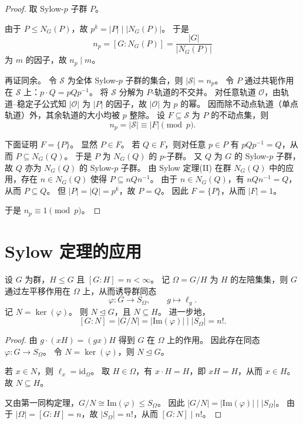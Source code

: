 \documentclass[lang=cn,a4paper,newtx]{elegantbook}
\begin{document}
\begin{proof}
  取 Sylow-$p$ 子群 $P$。

  由于 $P\le N_G(P)$，故 $p^k=|P|\mid |N_G(P)|$。
  于是
  \[
    n_p=[G:N_G(P)]=\frac{|G|}{|N_G(P)|}
  \]
  为 $m$ 的因子，故 $n_p\mid m$。

  再证同余。
  令 $\mathcal{S}$ 为全体 Sylow-$p$ 子群的集合，则 $|\mathcal{S}|=n_p$。
  令 $P$ 通过共轭作用在 $\mathcal{S}$ 上：$p\cdot Q=pQp^{-1}$。
  将 $\mathcal{S}$ 分解为 $P$-轨道的不交并。
  对任意轨道 $\mathcal{O}$，由轨道--稳定子公式知 $|\mathcal{O}|$ 为 $|P|$ 的因子，故 $|\mathcal{O}|$ 为 $p$ 的幂。
  因而除不动点轨道（单点轨道）外，其余轨道的大小均被 $p$ 整除。
  设 $F\subseteq \mathcal{S}$ 为 $P$ 的不动点集，则
  \[
    n_p=|\mathcal{S}|\equiv |F|\pmod p.
  \]

  下面证明 $F=\{P\}$。
  显然 $P\in F$。
  若 $Q\in F$，则对任意 $p\in P$ 有 $pQp^{-1}=Q$，从而 $P\subseteq N_G(Q)$。
  于是 $P$ 为 $N_G(Q)$ 的 $p$-子群。
  又 $Q$ 为 $G$ 的 Sylow-$p$ 子群，故 $Q$ 亦为 $N_G(Q)$ 的 Sylow-$p$ 子群。
  由 Sylow 定理(II) 在群 $N_G(Q)$ 中的应用，存在 $n\in N_G(Q)$ 使得 $P\subseteq nQn^{-1}$。
  由于 $n\in N_G(Q)$，有 $nQn^{-1}=Q$，从而 $P\subseteq Q$。
  但 $|P|=|Q|=p^k$，故 $P=Q$。
  因此 $F=\{P\}$，从而 $|F|=1$。

  于是 $n_p\equiv 1\pmod p$。
\end{proof}

\section{Sylow 定理的应用}

\begin{proposition}
  设 $G$ 为群，$H\le G$ 且 $[G:H]=n<\infty$。
  记 $\Omega=G/H$ 为 $H$ 的左陪集集，则 $G$ 通过左平移作用在 $\Omega$ 上，从而诱导群同态
  \[
    \varphi:G\to S_{\Omega},\qquad g\longmapsto \ell_g.
  \]
  记 $N=\ker(\varphi)$。
  则 $N\trianglelefteq G$，且 $N\subseteq H$。
  进一步地，
  \[
    [G:N]=|G/N|=|\mathrm{Im}(\varphi)|\mid |S_{\Omega}|=n!.
  \]
\end{proposition}

\begin{proof}
  由 $g\cdot (xH)=(gx)H$ 得到 $G$ 在 $\Omega$ 上的作用。
  因此存在同态 $\varphi:G\to S_{\Omega}$。
  令 $N=\ker(\varphi)$，则 $N\trianglelefteq G$。

  若 $x\in N$，则 $\ell_x=\mathrm{id}_{\Omega}$。
  取 $H\in\Omega$，有 $x\cdot H=H$，即 $xH=H$，从而 $x\in H$。
  故 $N\subseteq H$。

  又由第一同构定理，$G/N\cong \mathrm{Im}(\varphi)\le S_{\Omega}$。
  因此 $|G/N|=|\mathrm{Im}(\varphi)|\mid |S_{\Omega}|$。
  由于 $|\Omega|=[G:H]=n$，故 $|S_{\Omega}|=n!$，从而 $[G:N]\mid n!$。
\end{proof}
\end{document}
